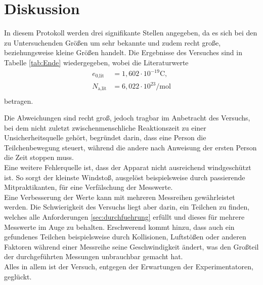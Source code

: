 \section{Diskussion}
\label{sec:Diskussion}

In diesem Protokoll werden drei signifikante Stellen angegeben, da es sich bei den zu Untersuchenden Größen um sehr bekannte und zudem recht große, beziehungsweise kleine Größen handelt.
Die Ergebnisse des Versuches sind in Tabelle \ref{tab:Ende} wiedergegeben, wobei die Literaturwerte \cite{chemie}
\begin{align*}
  e_{0\text{,lit}} &= 1,602 \cdot 10^{-19}\si{\coulomb},\\
  N_{\text{a,lit}} &= 6,022 \cdot 10^{23}\si{\per\mol}\\
\end{align*}
betragen.

Die Abweichungen sind recht groß, jedoch tragbar im Anbetracht des Versuchs, bei dem nicht zuletzt zwischenmenschliche Reaktionszeit zu einer Unsicherheitsquelle gehört, begründet darin, dass eine Person die Teilchenbewegung steuert, während die andere nach Anweisung der ersten Person die Zeit stoppen muss.\\
Eine weitere Fehlerquelle ist, dass der Apparat nicht ausreichend windgeschützt ist.
So sorgt der kleinste Windstoß, ausgelöst beispielsweise durch passierende Mitpraktikanten, für eine Verfälschung der Messwerte.\\
Eine Verbesserung der Werte kann mit mehreren Messreihen gewährleistet werden.
Die Schwierigkeit des Versuchs liegt aber darin, ein Teilchen zu finden, welches alle Anforderungen \ref{sec:durchfuehrung} erfüllt und dieses für mehrere Messwerte im Auge zu behalten.
Erschwerend kommt hinzu, dass auch ein gefundenes Teilchen beispielsweise durch Kollisionen, Luftstößen oder anderen Faktoren während einer Messreihe seine Geschwindigkeit ändert, was den Großteil der durchgeführten Messungen unbrauchbar gemacht hat.\\
Alles in allem ist der Versuch, entgegen der Erwartungen der Experimentatoren, geglückt.
